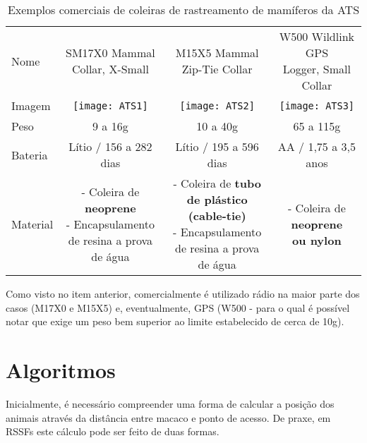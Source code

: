 \begin{table}[ht]
\centering
\caption{Exemplos comerciais de coleiras de rastreamento de mamíferos da ATS}
\vspace{0.5cm}
\begin{tabular}{l|ccc}
\hline
Nome & \makecell{SM17X0 Mammal \\ Collar, X-Small} & \makecell{M15X5 Mammal \\ Zip-Tie Collar} & \makecell{W500 Wildlink GPS \\ Logger, Small Collar} \\
Imagem & \texttt{[image: ATS1]} & \texttt{[image: ATS2]} & \texttt{[image: ATS3]} \vspace{0.4cm}\\

Peso & 9 a 16g & 10 a 40g & 65 a 115g \vspace{0.4cm}\\

Bateria & Lítio / 156 a 282 dias & Lítio / 195 a 596 dias & AA / 1,75 a 3,5 anos \vspace{0.4cm} \\

Material & 
\makecell{- Coleira de \\ \textbf{neoprene} \\
- Encapsulamento \\ de resina a prova \\ de água} &
\makecell{ - Coleira de \textbf{tubo} \\ \textbf{de plástico (cable-tie)} \\
- Encapsulamento \\ de resina a prova \\ de água} &
\makecell{- Coleira de \textbf{neoprene} \\ \textbf{ou nylon} }   
\end{tabular}
\end{table}

Como visto no item anterior, comercialmente é utilizado rádio na maior parte dos casos (M17X0 e M15X5) e, eventualmente, GPS (W500 - para o qual é possível notar que exige um peso bem superior ao limite estabelecido de cerca de 10g).
\FloatBarrier

\section{Algoritmos}
Inicialmente, é necessário compreender uma forma de calcular a posição dos animais através da distância entre macaco e ponto de acesso. De praxe, em RSSFs este cálculo pode ser feito de duas formas.

